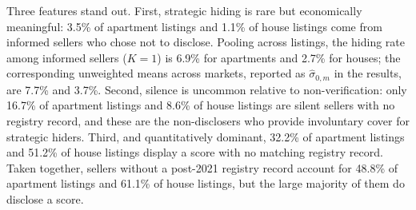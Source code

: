 \noindent Three features stand out. First, strategic hiding is rare but economically meaningful: 3.5\% of apartment listings and 1.1\% of house listings come from informed sellers who chose not to disclose. Pooling across listings, the hiding rate among informed sellers ($K=1$) is 6.9\% for apartments and 2.7\% for houses; the corresponding unweighted means across markets, reported as $\hat\sigma_{0,m}$ in the results, are 7.7\% and 3.7\%. Second, silence is uncommon relative to non-verification: only 16.7\% of apartment listings and 8.6\% of house listings are silent sellers with no registry record, and these are the non-disclosers who provide involuntary cover for strategic hiders. Third, and quantitatively dominant, 32.2\% of apartment listings and 51.2\% of house listings display a score with no matching registry record. Taken together, sellers without a post-2021 registry record account for 48.8\% of apartment listings and 61.1\% of house listings, but the large majority of them do disclose a score.
